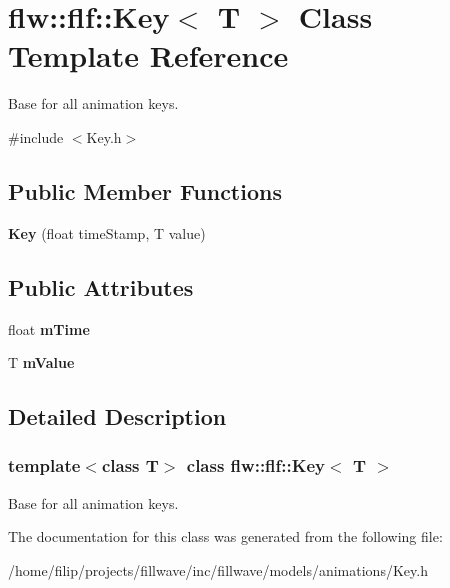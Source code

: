 \hypertarget{classflw_1_1flf_1_1Key}{}\section{flw\+:\+:flf\+:\+:Key$<$ T $>$ Class Template Reference}
\label{classflw_1_1flf_1_1Key}


Base for all animation keys.  




{\ttfamily \#include $<$Key.\+h$>$}

\subsection*{Public Member Functions}
\begin{DoxyCompactItemize}
\item 
\mbox{\label{classflw_1_1flf_1_1Key_a28b10bc048b2761a3e34566e0139111c}} 
{\bfseries Key} (float time\+Stamp, T value)
\end{DoxyCompactItemize}
\subsection*{Public Attributes}
\begin{DoxyCompactItemize}
\item 
\mbox{\label{classflw_1_1flf_1_1Key_a935d2e69a4f83e9fbb811069ed38158d}} 
float {\bfseries m\+Time}
\item 
\mbox{\label{classflw_1_1flf_1_1Key_aba66088ad43b89c391feaf4769d58836}} 
T {\bfseries m\+Value}
\end{DoxyCompactItemize}


\subsection{Detailed Description}
\subsubsection*{template$<$class T$>$\newline
class flw\+::flf\+::\+Key$<$ T $>$}

Base for all animation keys. 

The documentation for this class was generated from the following file\+:\begin{DoxyCompactItemize}
\item 
/home/filip/projects/fillwave/inc/fillwave/models/animations/Key.\+h\end{DoxyCompactItemize}
